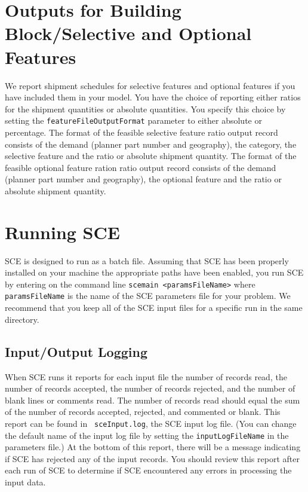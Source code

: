\section{Outputs for Building Block/Selective and Optional Features}
We report shipment schedules for selective features and optional features if
you have included them in your model.  You have the choice of reporting 
either ratios for the shipment quantities or absolute quantities.  You
specify this choice by setting the {\tt featureFileOutputFormat} parameter to
either absolute or percentage.  The format of the feasible selective feature ratio
output record consists of the demand (planner part number and geography), the
category, the selective feature and the ratio or absolute shipment quantity.
The format of the feasible optional feature ration ratio
output record consists of the demand (planner part number and geography), 
the optional feature and the ratio or absolute shipment quantity.

\section{Running SCE}
SCE is designed to run as a batch file.  Assuming that SCE has been
properly installed on your machine the appropriate paths have been
enabled, you run SCE by entering on the command line {\tt scemain
<paramsFileName>} where {\tt paramsFileName} is the name of the SCE
parameters file for your problem.  We recommend that you keep all of the
SCE input files for a specific run in the same directory.

\subsection{Input/Output Logging}
When SCE runs it reports for each input file the number of records
read, the number of records accepted, the number of records rejected,
and the number of blank lines or comments read.  The number of records
read should equal the sum of the number of records accepted, rejected,
and commented or blank.  This report can be found in {\tt
sceInput.log}, the SCE input log file. (You can change the default
name of the input log file by setting the {\tt inputLogFileName} in
the parameters file.)  At the bottom of this report, there will be a
message indicating if SCE has rejected any of the input records.  You
should review this report after each run of SCE to determine if SCE
encountered any errors in processing the input data.

